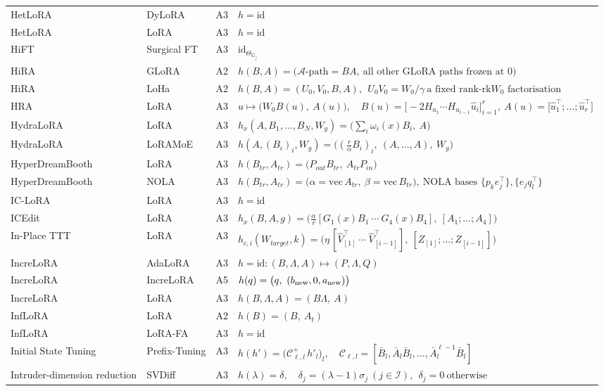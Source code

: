 \begin{longtable}{@{}>{\raggedright\arraybackslash}p{2.4cm}>{\raggedright\arraybackslash}p{2.4cm}c>{\raggedright\arraybackslash}p{8.6cm}@{}}
HetLoRA & DyLoRA & A3 & $h=\mathrm{id}$\\
HetLoRA & LoRA & A3 & $h=\mathrm{id}$\\
HiFT & Surgical FT & A3 & $\mathrm{id}_{\Theta_{G_j}}$\\
HiRA & GLoRA & A2 & $h(B,A)=\big(\mathcal A\text{-path}=BA,\ \text{all other GLoRA paths frozen at }0\big)$\\
HiRA & LoHa & A2 & $h(B,A)=(U_0,V_0,B,A),\ \ U_0V_0=W_0/\gamma\ \text{a fixed rank-}\mathrm{rk}W_0\text{ factorisation}$\\
HRA & LoRA & A3 & $u\mapsto\big(W_0B(u),\ A(u)\big),\quad B(u)=\big[-2H_{u_1}\cdots H_{u_{i-1}}\hat u_i\big]_{i=1}^r,\ A(u)=\big[\hat u_1^\top;\dots;\hat u_r^\top\big]$\\
HydraLoRA & LoRA & A3 & $h_x(A,B_1,\dots,B_N,W_g)=\big(\textstyle\sum_i\omega_i(x)B_i,\ A\big)$\\
HydraLoRA & LoRAMoE & A3 & $h(A,(B_i)_i,W_g)=\big((\tfrac r\alpha B_i)_i,\ (A,\dots,A),\ W_g\big)$\\
HyperDreamBooth & LoRA & A3 & $h(B_{tr},A_{tr})=\big(P_{out}B_{tr},\ A_{tr}P_{in}\big)$\\
HyperDreamBooth & NOLA & A3 & $h(B_{tr},A_{tr})=\big(\alpha=\mathrm{vec}\,A_{tr},\ \beta=\mathrm{vec}\,B_{tr}\big),\ \text{NOLA bases }\{p_ke_j^\top\},\{e_jq_l^\top\}$\\
IC-LoRA & LoRA & A3 & $h=\mathrm{id}$\\
ICEdit & LoRA & A3 & $h_x(B,A,g)=\big(\tfrac\alpha r[G_1(x)B_1\ \cdots\ G_4(x)B_4],\ [A_1;\dots;A_4]\big)$\\
In-Place TTT & LoRA & A3 & $h_{c,i}(W_{target},k)=\big(\eta\,[\hat V_{[1]}^\top\ \cdots\ \hat V_{[i-1]}^\top],\ [Z_{[1]};\dots;Z_{[i-1]}]\big)$\\
IncreLoRA & AdaLoRA & A3 & $h=\mathrm{id}:(B,\Lambda,A)\mapsto(P,\Lambda,Q)$\\
IncreLoRA & IncreLoRA & A5 & $h(q)=\big(q,\ (b_{\rm new},0,a_{\rm new})\big)$\\
IncreLoRA & LoRA & A3 & $h(B,\Lambda,A)=(B\Lambda,\ A)$\\
InfLoRA & LoRA & A2 & $h(B)=(B,\ A_t)$\\
InfLoRA & LoRA-FA & A3 & $h=\mathrm{id}$\\
Initial State Tuning & Prefix-Tuning & A3 & $h(h')=\big(\mathcal C_{\ell,l}^{+}\,h'_l\big)_l,\quad \mathcal C_{\ell,l}=[\bar B_l,\bar A_l\bar B_l,\dots,\bar A_l^{\ell-1}\bar B_l]$\\
Intruder-dimension reduction & SVDiff & A3 & $h(\lambda)=\delta,\quad \delta_j=(\lambda-1)\sigma_j\ (j\in\mathcal I),\ \ \delta_j=0\ \text{otherwise}$\\

\end{longtable}

